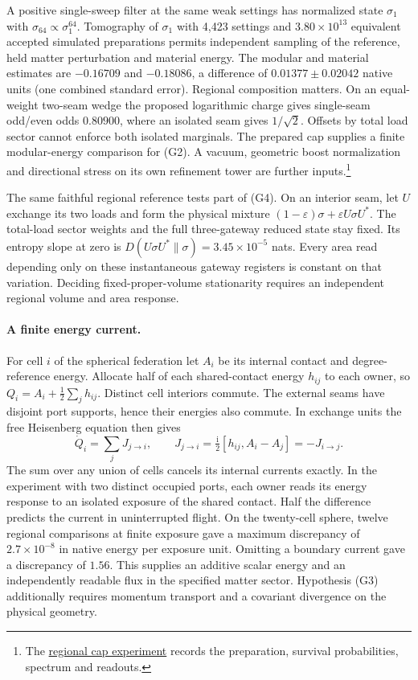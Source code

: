 \documentclass[11pt]{article}
\begin{document}
A positive single-sweep filter at the same weak settings has normalized
state $\sigma_1$ with $\sigma_{64}\propto\sigma_1^{64}$. Tomography
of $\sigma_1$ with 4,423 settings and $3.80\times10^{13}$ equivalent
accepted simulated preparations permits independent sampling of the
reference, held matter perturbation and material energy. The modular
and material estimates are $-0.16709$ and $-0.18086$, a difference of
$0.01377\pm0.02042$ native units (one combined standard error).
Regional composition matters. On an equal-weight two-seam wedge the
proposed logarithmic charge gives single-seam odd/even odds $0.80900$,
where an isolated seam gives $1/\sqrt2$. Offsets by total load sector
cannot enforce both isolated marginals. The prepared cap supplies a
finite modular-energy comparison for (G2). A vacuum, geometric boost
normalization and directional stress on its own refinement tower are
further inputs.\footnote{The
\href{https://github.com/FloatingPragma/observer-patch-holography/tree/main/model/experiments/interval_echo_einstein_station}{regional cap experiment}
records the preparation, survival probabilities, spectrum and readouts.}

The same faithful regional reference tests part of (G4). On an interior
seam, let $U$ exchange its two loads and form the physical mixture
$(1-\varepsilon)\sigma+\varepsilon U\sigma U^*$. The total-load sector
weights and the full three-gateway reduced state stay fixed. Its entropy
slope at zero is $D(U\sigma U^*\|\sigma)=3.45\times10^{-5}$ nats.
Every area read depending only on these instantaneous gateway registers
is constant on that variation. Deciding fixed-proper-volume stationarity
requires an independent regional volume and area response.

\paragraph{A finite energy current.}
For cell $i$ of the spherical federation let $A_i$ be its internal
contact and degree-reference energy. Allocate half of each shared-contact
energy $h_{ij}$ to each owner, so $Q_i=A_i+\tfrac12\sum_j h_{ij}$.
Distinct cell interiors commute. The external seams have disjoint port
supports, hence their energies also commute. In exchange units the free
Heisenberg equation then gives
\[
  \dot Q_i=\sum_j J_{j\to i},\qquad
  J_{j\to i}=\tfrac{\mathrm{i}}{2}[h_{ij},A_i-A_j]=-J_{i\to j}.
\]
The sum over any union of cells cancels its internal currents exactly.
In the experiment with two distinct occupied ports, each owner reads its energy
response to an isolated exposure of the shared contact. Half the difference predicts the
current in uninterrupted flight. On the twenty-cell sphere, twelve
regional comparisons at finite exposure gave a maximum discrepancy of
$2.7\times10^{-8}$ in native energy per exposure unit. Omitting a
boundary current gave a discrepancy of $1.56$. This supplies an additive
scalar energy and an independently readable flux in the specified
matter sector. Hypothesis (G3) additionally requires momentum transport
and a covariant divergence on the physical geometry.
\end{document}

